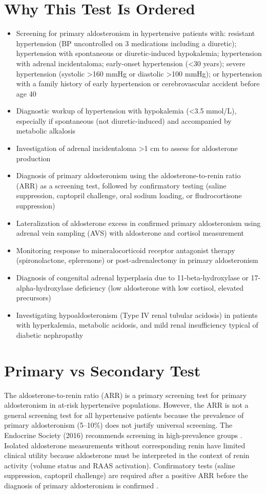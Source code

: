 \section*{Why This Test Is Ordered}
\begin{itemize}
  \item Screening for primary aldosteronism in hypertensive patients with: resistant hypertension (BP uncontrolled on 3 medications including a diuretic); hypertension with spontaneous or diuretic-induced hypokalemia; hypertension with adrenal incidentaloma; early-onset hypertension (<30 years); severe hypertension (systolic >160 mmHg or diastolic >100 mmHg); or hypertension with a family history of early hypertension or cerebrovascular accident before age 40
  \item Diagnostic workup of hypertension with hypokalemia (<3.5 mmol/L), especially if spontaneous (not diuretic-induced) and accompanied by metabolic alkalosis
  \item Investigation of adrenal incidentaloma >1 cm to assess for aldosterone production
  \item Diagnosis of primary aldosteronism using the aldosterone-to-renin ratio (ARR) as a screening test, followed by confirmatory testing (saline suppression, captopril challenge, oral sodium loading, or fludrocortisone suppression)
  \item Lateralization of aldosterone excess in confirmed primary aldosteronism using adrenal vein sampling (AVS) with aldosterone and cortisol measurement
  \item Monitoring response to mineralocorticoid receptor antagonist therapy (spironolactone, eplerenone) or post-adrenalectomy in primary aldosteronism
  \item Diagnosis of congenital adrenal hyperplasia due to 11-beta-hydroxylase or 17-alpha-hydroxylase deficiency (low aldosterone with low cortisol, elevated precursors)
  \item Investigating hypoaldosteronism (Type IV renal tubular acidosis) in patients with hyperkalemia, metabolic acidosis, and mild renal insufficiency typical of diabetic nephropathy
\end{itemize}

\section*{Primary vs Secondary Test}
The aldosterone-to-renin ratio (ARR) is a primary screening test for primary aldosteronism in at-risk hypertensive populations. However, the ARR is not a general screening test for all hypertensive patients because the prevalence of primary aldosteronism (5--10\%) does not justify universal screening. The Endocrine Society (2016) recommends screening in high-prevalence groups \cite{funder2016management}. Isolated aldosterone measurements without corresponding renin have limited clinical utility because aldosterone must be interpreted in the context of renin activity (volume status and RAAS activation). Confirmatory tests (saline suppression, captopril challenge) are required after a positive ARR before the diagnosis of primary aldosteronism is confirmed \cite{funder2016management}.

